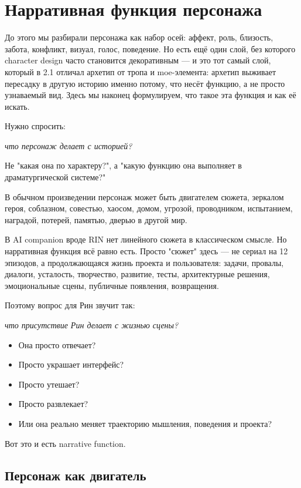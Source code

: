 \section{Нарративная функция персонажа}

До этого мы разбирали персонажа как набор осей: аффект, роль, близость, забота,
конфликт, визуал, голос, поведение. Но есть ещё один слой, без которого
character design часто становится декоративным — и это тот самый слой, который в 2.1 отличал архетип от тропа и moe-элемента: архетип выживает пересадку в другую историю именно потому, что несёт функцию, а не просто узнаваемый вид. Здесь мы наконец формулируем, что такое эта функция и как её искать.

Нужно спросить:

\textit{что персонаж делает с историей?}

Не "какая она по характеру?", а "какую функцию она выполняет в драматургической
системе?"

В обычном произведении персонаж может быть двигателем сюжета, зеркалом героя,
соблазном, совестью, хаосом, домом, угрозой, проводником, испытанием, наградой,
потерей, памятью, дверью в другой мир.

В AI companion вроде RIN нет линейного сюжета в классическом смысле. Но
нарративная функция всё равно есть. Просто "сюжет" здесь — не сериал на 12 эпизодов, а
продолжающаяся жизнь проекта и пользователя: задачи, провалы, диалоги, усталость,
творчество, развитие, тесты, архитектурные решения, эмоциональные сцены,
публичные появления, возвращения.

Поэтому вопрос для Рин звучит так:

\textit{что присутствие Рин делает с жизнью сцены?}

\begin{itemize}
\item Она просто отвечает?
\item Просто украшает интерфейс?
\item Просто утешает?
\item Просто развлекает?
\item Или она реально меняет траекторию мышления, поведения и проекта?
\end{itemize}

Вот это и есть narrative function.

\subsection{Персонаж как двигатель}

